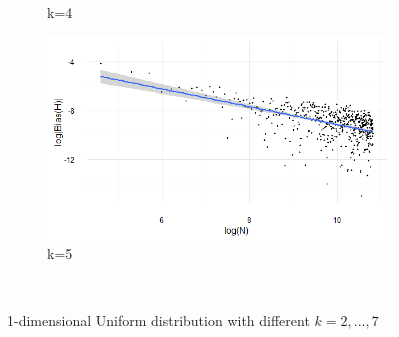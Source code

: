 \documentclass{report}
\begin{document}
\begin{figure}
{\begin{subfigure}[b]{.8\textwidth}
\caption{k=4}
\end{subfigure}%
\begin{subfigure}[b]{.8\textwidth}
\centering
\includegraphics[width=\textwidth]{./Graphs/Best/Uniform_k=5.png}
\caption{k=5}
\end{subfigure}%
}\    
\caption{1-dimensional Uniform distribution with different $k = 2, ..., 7$} \label{Uniform_graphs27}
\end{figure}
\end{document}
